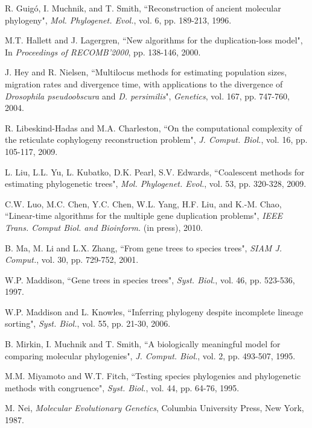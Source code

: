 \documentclass[9.5pt,journal,letterpaper,compsoc]{IEEEtran}
\begin{document}
\begin{thebibliography}{99}
R.  Guig\'{o}, I. Muchnik, and T. Smith, ``Reconstruction of ancient
molecular phylogeny", {\it Mol. Phylogenet. Evol.}, vol. 6, pp.
189-213, 1996.

M.T. Hallett and J. Lagergren,  ``New algorithms for the
duplication-loss model",  In {\it Proceedings of RECOMB'2000}, pp.
138-146, 2000.

J. Hey and R. Nielsen,
 ``Multilocus methods for estimating population
sizes, migration rates and divergence time, with applications to the
divergence of {\it Drosophila pseudoobscura} and {\it D.
persimilis}", {\it Genetics}, vol. 167, pp. 747-760, 2004.

R. Libeskind-Hadas and M.A. Charleston,  ``On the computational
complexity of the reticulate cophylogeny reconstruction problem",
{\it J. Comput. Biol.}, vol. 16, pp. 105-117, 2009.


L. Liu, L.L. Yu, L. Kubatko, D.K. Pearl, S.V. Edwards, ``Coalescent
methods for estimating phylogenetic trees",  {\it Mol. Phylogenet.
Evol.}, vol. 53, pp. 320-328, 2009.

C.W. Luo, M.C. Chen, Y.C. Chen, W.L. Yang, H.F. Liu, and K.-M. Chao,
``Linear-time algorithms for the multiple gene duplication
problems",  {\it IEEE Trans. Comput Biol. and Bioinform.} (in
press), 2010.

B. Ma, M. Li and L.X. Zhang, ``From gene trees to species trees",
{\it SIAM J. Comput.}, vol. 30, pp. 729-752, 2001.

W.P. Maddison,
 ``Gene trees in species trees", {\it Syst. Biol.}, vol. 46, pp. 523-536,
 1997.

W.P. Maddison and L. Knowles, ``Inferring phylogeny despite
incomplete lineage sorting",  {\it Syst. Biol.}, vol. 55, pp.
21-30, 2006.

 B. Mirkin, I. Muchnik and T. Smith,
 ``A biologically meaningful model for comparing molecular phylogenies",
 {\it J. Comput. Biol.}, vol. 2, pp. 493-507, 1995.

M.M. Miyamoto and W.T. Fitch, ``Testing species phylogenies and
phylogenetic methods with congruence",  {\it Syst. Biol.}, vol. 44,
pp. 64-76, 1995.

M. Nei,
   {\it Molecular Evolutionary Genetics}, Columbia University Press,
    New York, 1987.


\end{thebibliography}
\end{document}
